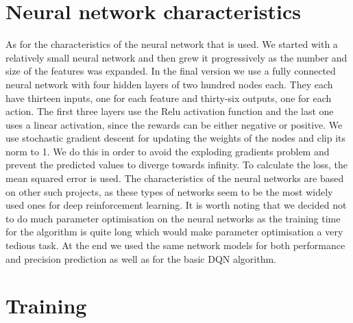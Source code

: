 \section{Neural network characteristics}
As for the characteristics of the neural network that is used. We started with a relatively small neural network and then grew it progressively as the number and size of the features was expanded. In the final version we use a fully connected neural network with four hidden layers of two hundred nodes each. They each have thirteen inputs, one for each feature and thirty-six outputs, one for each action. The first three layers use the Relu activation function and the last one uses a linear activation, since the rewards can be either negative or positive. We use stochastic gradient descent for updating the weights of the nodes and clip its norm to 1. We do this in order to avoid the exploding gradients problem and prevent the predicted values to diverge towards infinity. To calculate the loss, the mean squared error is used. The characteristics of the neural networks are based on other such projects, as these types of networks seem to be the most widely used ones for deep reinforcement learning. It is worth noting that we decided not to do much parameter optimisation on the neural networks as the training time for the algorithm is quite long which would make parameter optimisation a very tedious task. At the end we used the same network models for both performance and precision prediction as well as for the basic DQN algorithm.
\section{Training}


